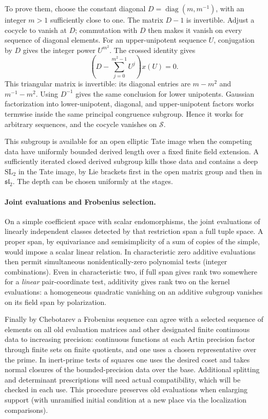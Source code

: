 To prove them, choose the constant diagonal
\(D=\operatorname{diag}(m,m^{-1})\), with an integer \(m>1\) sufficiently
close to one. The matrix \(D-1\) is invertible. Adjust a cocycle to vanish
at \(D\); commutation with \(D\) then makes it vanish on every sequence
of diagonal elements. For an upper-unipotent sequence \(U\), conjugation
by \(D\) gives the integer power \(U^{m^2}\). The crossed identity gives
\[
             \left(D-\sum_{j=0}^{m^2-1}U^j\right)x(U)=0.
\]
This triangular matrix is invertible: its diagonal entries are
\(m-m^2\) and \(m^{-1}-m^2\). Using \(D^{-1}\) gives the same conclusion
for lower unipotents. Gaussian factorization into lower-unipotent,
diagonal, and upper-unipotent factors works termwise inside the same
principal congruence subgroup. Hence it works for arbitrary sequences,
and the cocycle vanishes on \(\mathcal S\).

This subgroup is available for an open elliptic Tate image when the
competing data have uniformly bounded derived length over a fixed finite
field extension. A sufficiently iterated closed derived subgroup kills
those data and contains a deep \(\mathrm{SL}_2\) in the Tate image, by
Lie brackets first in the open matrix group and then in
\(\mathfrak{sl}_2\). The depth can be chosen uniformly at the stages.

\paragraph{Joint evaluations and Frobenius selection.}
On a simple coefficient space with scalar endomorphisms, the joint evaluations of linearly independent classes detected by that restriction span a full tuple space. A proper span, by equivariance and semisimplicity of a sum of copies of the simple, would impose a scalar linear relation. In characteristic zero additive evaluations then permit simultaneous nonidentically-zero polynomial tests (integer combinations). Even in characteristic two, if full span gives rank two somewhere for a \emph{linear} pair-coordinate test, additivity gives rank two on the kernel evaluations: a homogeneous quadratic vanishing on an additive subgroup vanishes on its field span by polarization. 

Finally by Chebotarev a Frobenius sequence can agree with a selected sequence of elements on all old evaluation matrices and other designated finite continuous data to increasing precision: continuous functions at each Artin precision factor through finite sets on finite quotients, and one uses a chosen representative over the prime. In inert-prime tests of squares one uses the desired coset and takes normal closures of the bounded-precision data over the base. Additional splitting and determinant prescriptions will need actual compatibility, which will be checked in each use. This procedure preserves old evaluations when enlarging support (with unramified initial condition at a new place via the localization comparisons).

